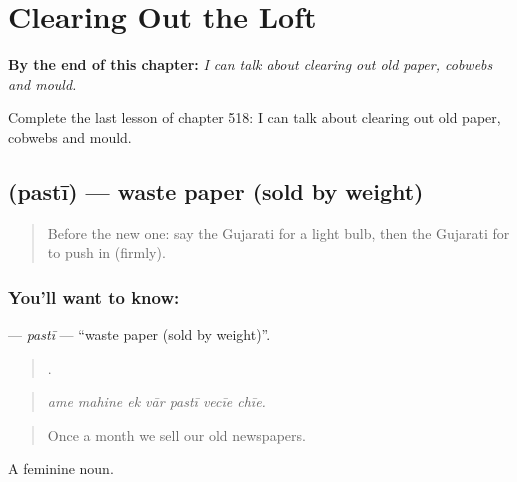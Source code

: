 
\chapter{Clearing Out the Loft}
\label{ch:gu-clearing-out-the-loft}

\begin{chapteropening}
\textbf{By the end of this chapter:} \emph{I can talk about clearing out old paper, cobwebs and mould.}

Complete the last lesson of chapter 518: I can talk about clearing out old paper, cobwebs and mould.
\end{chapteropening}

\section[\texorpdfstring{\gu{પસ્તી} (pastī)}{પસ્તી (pastī)}]{ (pastī) — waste paper (sold by weight)}

\label{lesson:GU-C518-pasti}



\begin{quote}
Before the new one: say the Gujarati for a light bulb, then the Gujarati for to push in (firmly).
\end{quote}

\subsection*{You'll want to know: }
\textbf{} — \emph{pastī} — \textquotedblleft{}waste paper (sold by weight)\textquotedblright{}.

\begin{quote}
      .
\end{quote}

\begin{quote}
\emph{ame mahine ek vār pastī vecīe chīe.}
\end{quote}

\begin{quote}
Once a month we sell our old newspapers.
\end{quote}

A feminine noun.

